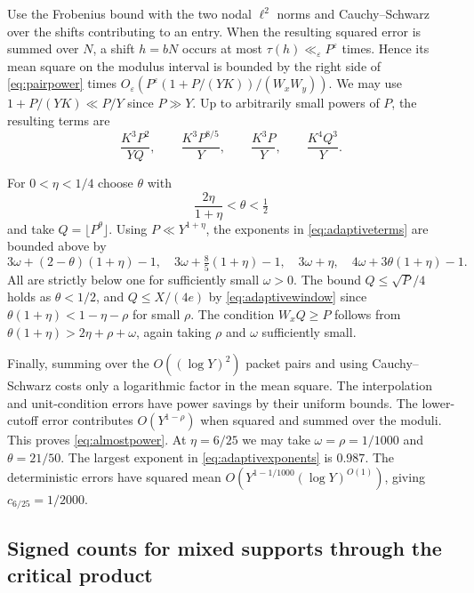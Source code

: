 \documentclass[11pt,a4paper]{article}
\numberwithin{equation}{section}
\begin{document}
Use the Frobenius bound with the two nodal $\ell^2$ norms
and Cauchy--Schwarz over the shifts contributing to an entry.
When the resulting squared error is summed over $N$, a
shift $h=bN$ occurs at most $\tau(h)\ll_\varepsilon P^\varepsilon$
times. Hence its mean square on the modulus interval is
bounded by the right side of \cref{eq:pairpower} times
$O_\varepsilon(P^\varepsilon(1+P/(YK))/(W_xW_y))$.
We may use $1+P/(YK)\ll P/Y$ since $P\gg Y$. Up to
arbitrarily small powers of $P$, the resulting terms are
\begin{equation}
 \frac{K^3 P^2}{YQ},\qquad \frac{K^3P^{8/5}}{Y},
 \qquad \frac{K^3P}{Y},\qquad \frac{K^4Q^3}{Y}.
 \label{eq:adaptiveterms}
\end{equation}

For $0<\eta<1/4$ choose $\theta$ with
\[
 \frac{2\eta}{1+\eta}<\theta<\tfrac12
\]
and take $Q=\lfloor P^\theta\rfloor$.
Using $P\ll Y^{1+\eta}$, the exponents in
\cref{eq:adaptiveterms} are bounded above by
\begin{equation}
 3\omega+(2-\theta)(1+\eta)-1,\quad
 3\omega+\tfrac85(1+\eta)-1,\quad
 3\omega+\eta,\quad 4\omega+3\theta(1+\eta)-1.
 \label{eq:adaptivexponents}
\end{equation}
All are strictly below one for sufficiently small $\omega>0$.
The bound $Q\le\sqrt P/4$ holds as $\theta<1/2$, and
$Q\le X/(4e)$ by \cref{eq:adaptivewindow} since
$\theta(1+\eta)<1-\eta-\rho$ for small $\rho$.
The condition $W_x Q\ge P$ follows from
$\theta(1+\eta)>2\eta+\rho+\omega$, again taking $\rho$
and $\omega$ sufficiently small.

Finally, summing over the $O((\log Y)^2)$ packet pairs and
using Cauchy--Schwarz costs only a logarithmic factor in
the mean square. The interpolation and unit-condition
errors have power savings by their uniform bounds.
The lower-cutoff error contributes $O(Y^{1-\rho})$ when
squared and summed over the moduli. This proves
\cref{eq:almostpower}. At $\eta=6/25$ we may take
$\omega=\rho=1/1000$ and $\theta=21/50$. The largest
exponent in \cref{eq:adaptivexponents} is $0.987$.
The deterministic errors have squared mean
$O(Y^{1-1/1000}(\log Y)^{O(1)})$, giving
$c_{6/25}=1/2000$.

\subsection{Signed counts for mixed supports through the critical product}
\end{document}
